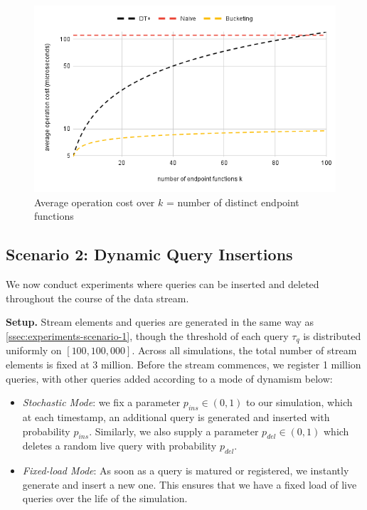 \begin{center}
\begin{figure}[h]
\centering
\includegraphics[scale=0.45]{thesis/figures/chart3.1.png}
\caption{Average operation cost over $k$ = number of distinct endpoint functions}
\end{figure}
\end{center}

\newpage
\subsection{Scenario 2: Dynamic Query Insertions}
\label{ssec:experiments-scenario-2}

We now conduct experiments where queries can be inserted and deleted throughout the course of the data stream. 

\textbf{Setup.} Stream elements and queries are generated in the same way as \cref{ssec:experiments-scenario-1}, though the threshold of each query $\tau_q$ is distributed uniformly on $[100, 100,000]$. Across all simulations, the total number of stream elements is fixed at 3 million. Before the stream commences, we register 1 million queries, with other queries added according to a mode of dynamism below: 
\begin{itemize}
    \item \textit{Stochastic Mode}: we fix a parameter $p_{ins}\in(0,1)$ to our simulation, which at each timestamp, an additional query is generated and inserted with probability $p_{ins}$. Similarly, we also supply a parameter $p_{del}\in(0,1)$ which deletes a random live query with probability $p_{del}$. 
    \item \textit{Fixed-load Mode}: As soon as a query is matured or registered, we instantly generate and insert a new one. This ensures that we have a fixed load of live queries over the life of the simulation.
\end{itemize}

